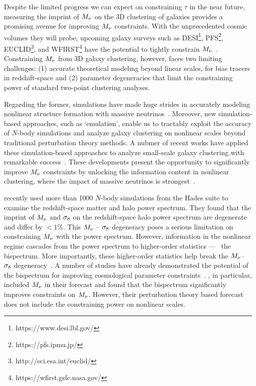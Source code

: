 Despite the limited progress we can expect on constraining $\tau$ in the
near future, measuring the imprint of $M_\nu$ on the 3D clustering of galaxies
provides a promising avenue for improving $M_\nu$ constraints. With the
unprecedented cosmic volumes they will probe, upcoming galaxy surveys 
such as DESI\footnote{https://www.desi.lbl.gov/}, PFS\footnote{https://pfs.ipmu.jp/}, 
EUCLID\footnote{http://sci.esa.int/euclid/}, and WFIRST\footnote{https://wfirst.gsfc.nasa.gov/} 
have the potential to tightly constrain $M_\nu$~\citep{audren2013, font-ribera2014, petracca2016, sartoris2016, boyle2018}.
Constraining $M_\nu$ from 3D galaxy clustering, however, faces two limiting
challenges: (1) accurate theoretical modeling beyond linear scales, for bias
tracers in redshift-space and (2) parameter degeneracies that limit the
constraining power of standard two-point clustering analyses. 

Regarding the former, simulations have made huge strides in accurately modeling 
nonlinear structure formation with massive neutrinos~\citep[\eg][]{brandbyge2008, 
villaescusa-navarro2013, castorina2015, adamek2017, emberson2017, banerjee2018, 
villaescusa-navarro2018, villaescusa-navarro2019}. Moreover, new simulation-based
approaches, such as `emulation', enable us to tractably exploit the accuracy of 
$N$-body simulations and analyze galaxy clustering on nonlinear scales beyond
traditional perturbation theory methods. A nubmer of recent works have applied
these simulation-based approaches to analyze small-scale galaxy clustering with
remarkable success~\citep[\eg][]{heitmann2009, kwan2015, euclidcollaboration2018, lange2019, zhai2019, wibking2019}. 
These developments present the opportunity to significantly improve $M_\nu$
constraints by unlocking the information content in nonlinear clustering, where
the impact of massive neutrinos is strongest~\citep[\eg][]{brandbyge2008,
saito2008, wong2008, saito2009, viel2010, agarwal2011, marulli2011, bird2012,
castorina2015, banerjee2016, upadhye2016}.

\cite{villaescusa-navarro2018} recently used more than 1000 $N$-body simulations from
the {\sc Hades} suite to examine the redshift-space matter and halo power spectrum. 
They found that the imprint of $M_\nu$ and $\sigma_8$ on the redshift-space halo power
spectrum are degenerate and differ by $< 1\%$. This $M_\nu$ -- $\sigma_8$ degeneracy poses 
a serious limitation on constraining $M_\nu$ with the power spectrum. However,
information in the nonlinear regime cascades from the power spectrum to
higher-order statistics --- \eg~the bispectrum. More importantly, these
higher-order statistics help break the $M_\nu$--$\sigma_8$
degeneracy~\citep{hahn2020}. A number of studies have already demonstrated the potential of the bispectrum for improving cosmological
parameter constraints~\citep{sefusatti2005, sefusatti2006, chan2017, yankelevich2019}. 
\cite{chudaykin2019}, in particular, included $M_\nu$ in their forecast and
found that the bispectrum significantly improves constraints on $M_\nu$.
However, their perturbation theory based forecast does not include the
constraining power on nonlinear scales. 

